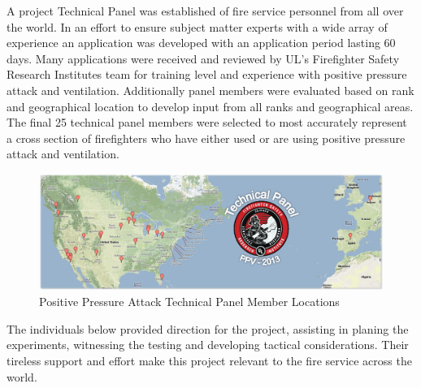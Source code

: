 \documentclass{article}
\begin{document}
A project Technical Panel was established of fire service personnel from all over the world. In an effort to ensure subject matter experts with a wide array of experience an application was developed with an application period lasting 60 days. Many applications were received and reviewed by UL's Firefighter Safety Research Institutes team for training level and experience with positive pressure attack and ventilation. Additionally panel members were evaluated based on rank and geographical location to develop input from all ranks and geographical areas. The final 25 technical panel members were selected to most accurately represent a cross section of firefighters who have either used or are using positive pressure attack and ventilation. 

\begin{figure}[H]
	\centering
	\includegraphics[width = 5in]{0_Images/Technical_Panel/TechnicalPanelLocations.png} 
	\caption{Positive Pressure Attack Technical Panel Member Locations}
	\label{fig:PanelLocatoins}
\end{figure} 

The individuals below provided direction for the project, assisting in planing the experiments, witnessing the testing and developing tactical considerations. Their tireless support and effort make this project relevant to the fire service across the world. 

\renewcommand{\arraystretch}{1.5}
\end{document}
